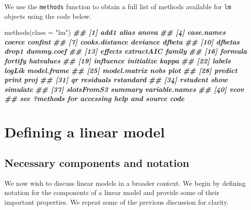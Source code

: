 \documentclass[
]{book}
\newenvironment{Shaded}{\begin{snugshade}}{\end{snugshade}}
\newcommand{\AttributeTok}[1]{\textcolor[rgb]{0.77,0.63,0.00}{#1}}
\newcommand{\DocumentationTok}[1]{\textcolor[rgb]{0.56,0.35,0.01}{\textbf{\textit{#1}}}}
\newcommand{\FunctionTok}[1]{\textcolor[rgb]{0.00,0.00,0.00}{#1}}
\newcommand{\NormalTok}[1]{#1}
\newcommand{\StringTok}[1]{\textcolor[rgb]{0.31,0.60,0.02}{#1}}
\theoremstyle{definition}
\theoremstyle{definition}
\theoremstyle{definition}
\theoremstyle{definition}
\theoremstyle{remark}
\begin{document}
We use the \texttt{methods} function to obtain a full list of methods available for \texttt{lm} objects using the code below.

\begin{Shaded}
\begin{Highlighting}[]
\FunctionTok{methods}\NormalTok{(}\AttributeTok{class =} \StringTok{"lm"}\NormalTok{)}
\DocumentationTok{\#\#  [1] add1           alias          anova         }
\DocumentationTok{\#\#  [4] case.names     coerce         confint       }
\DocumentationTok{\#\#  [7] cooks.distance deviance       dfbeta        }
\DocumentationTok{\#\# [10] dfbetas        drop1          dummy.coef    }
\DocumentationTok{\#\# [13] effects        extractAIC     family        }
\DocumentationTok{\#\# [16] formula        fortify        hatvalues     }
\DocumentationTok{\#\# [19] influence      initialize     kappa         }
\DocumentationTok{\#\# [22] labels         logLik         model.frame   }
\DocumentationTok{\#\# [25] model.matrix   nobs           plot          }
\DocumentationTok{\#\# [28] predict        print          proj          }
\DocumentationTok{\#\# [31] qr             residuals      rstandard     }
\DocumentationTok{\#\# [34] rstudent       show           simulate      }
\DocumentationTok{\#\# [37] slotsFromS3    summary        variable.names}
\DocumentationTok{\#\# [40] vcov          }
\DocumentationTok{\#\# see \textquotesingle{}?methods\textquotesingle{} for accessing help and source code}
\end{Highlighting}
\end{Shaded}

\hypertarget{defining-a-linear-model}{%
\section{Defining a linear model}\label{defining-a-linear-model}}

\hypertarget{ss-necessary-components}{%
\subsection{Necessary components and notation}\label{ss-necessary-components}}

We now wish to discuss linear models in a broader context. We begin by defining notation for the components of a linear model and provide some of their important properties. We repeat some of the previous discussion for clarity.
\end{document}
